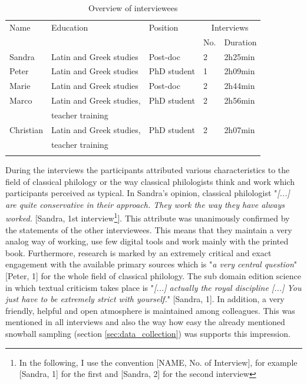 \documentclass[12pt, a4paper, titlepage, oneside, abstract=true, toc=listof, toc=bibliography, BCOR=1cm]{scrreprt}
\begin{document}
\small
\begin{table}
\caption{Overview of interviewees}
\label{tab:interviewees}
\centering
\begin{tabular}{lllll}
& & & &\\
\hline
Name & Education & Position & \multicolumn{2}{c}{Interviews}\\
 & &  & No. & Duration\\
\hline
\hline
Sandra & Latin and Greek studies & Post-doc & 2 & 2h25min\\
Peter & Latin and Greek studies & PhD student & 1 & 2h09min\\
Marie & Latin and Greek studies & Post-doc & 2 & 2h44min\\
Marco & Latin and Greek studies, & PhD student & 2 & 2h56min\\
      & teacher training & & & \\
Christian & Latin and Greek studies, & PhD student & 2 & 2h07min\\
      & teacher training & & & \\
\hline
& & & &\\
\end{tabular}
\end{table}
\normalsize

During the interviews the participants attributed various characteristics to the field of classical philology or the way classical philologists think and work which participants perceived as typical. %
In Sandra's opinion, classical philologist "\textit{[...] are quite conservative in their approach. They work the way they have always worked.} [Sandra, 1st interview\footnote{In the following, I use the convention [NAME, No. of Interview], for example [Sandra, 1] for the first and [Sandra, 2] for the second interview}]. This attribute was unanimously confirmed by the statements of the other interviewees. This means that they maintain a very analog way of working, use few digital tools and work mainly with the printed book. %
Furthermore, research is marked by an extremely critical and exact engagement with the available primary sources which is "\textit{a very central question}" [Peter, 1] for the whole field of classical philology. The sub domain edition science in which textual criticism takes place is "\textit{[...] actually the royal discipline [...] You just have to be extremely strict with yourself.}" [Sandra, 1]. In addition, a very friendly, helpful and open atmosphere is maintained among colleagues. This was mentioned in all interviews and also the way how easy the already mentioned snowball sampling (section \ref{sec:data_collection}) was supports this impression.
\end{document}
